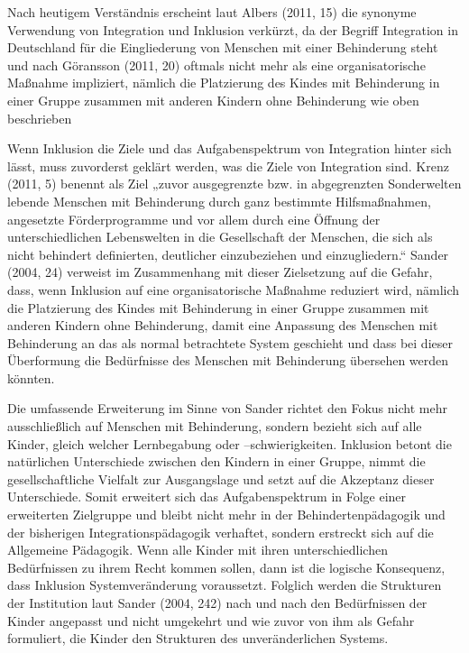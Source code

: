 Nach heutigem Verständnis erscheint laut Albers (2011, 15) die synonyme Verwendung von Integration und Inklusion verkürzt, da der Begriff Integration in Deutschland für die Eingliederung von Menschen mit einer Behinderung steht und nach Göransson (2011, 20) oftmals nicht mehr als eine organisatorische Maßnahme impliziert, nämlich die Platzierung des Kindes mit Behinderung in einer Gruppe zusammen mit anderen Kindern ohne Behinderung wie oben beschrieben

Wenn Inklusion die Ziele und das Aufgabenspektrum von Integration hinter sich lässt, muss zuvorderst geklärt werden, was die Ziele von Integration sind. 
Krenz (2011, 5) benennt als Ziel „zuvor ausgegrenzte bzw. in abgegrenzten Sonderwelten lebende Menschen mit Behinderung durch ganz bestimmte Hilfsmaßnahmen, angesetzte Förderprogramme und vor allem durch eine Öffnung der unterschiedlichen Lebenswelten in die Gesellschaft der Menschen, die sich als nicht behindert definierten, deutlicher einzubeziehen und einzugliedern.“ Sander (2004, 24) verweist im Zusammenhang mit dieser Zielsetzung auf die Gefahr, dass, wenn Inklusion auf eine organisatorische Maßnahme reduziert wird, nämlich die Platzierung des Kindes mit Behinderung in einer Gruppe zusammen mit anderen Kindern ohne Behinderung, damit eine Anpassung des Menschen mit Behinderung an das als normal betrachtete System geschieht und dass bei dieser Überformung die Bedürfnisse des Menschen mit Behinderung übersehen werden könnten. 

Die umfassende Erweiterung im Sinne von Sander richtet den Fokus nicht mehr ausschließlich auf Menschen mit Behinderung, sondern bezieht sich auf alle Kinder, gleich welcher Lernbegabung oder --schwierigkeiten. Inklusion betont die natürlichen Unterschiede zwischen den Kindern in einer Gruppe, nimmt die gesellschaftliche Vielfalt zur Ausgangslage und setzt auf die Akzeptanz dieser Unterschiede. Somit erweitert sich das Aufgabenspektrum in Folge einer erweiterten Zielgruppe und bleibt nicht mehr in der Behindertenpädagogik und der bisherigen Integrationspädagogik verhaftet, sondern erstreckt sich auf die Allgemeine Pädagogik. Wenn alle Kinder mit ihren unterschiedlichen Bedürfnissen zu ihrem Recht kommen sollen, dann ist die logische Konsequenz, dass Inklusion Systemveränderung voraussetzt. Folglich werden die Strukturen der Institution laut Sander (2004, 242) nach und nach den Bedürfnissen der Kinder angepasst und nicht umgekehrt und wie zuvor von ihm als Gefahr formuliert, die Kinder den Strukturen des unveränderlichen Systems.

